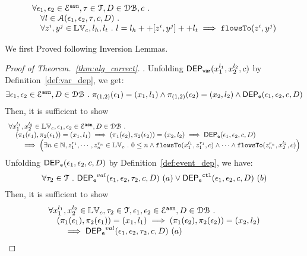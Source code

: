 
\begin{thm}[Correctness]
\label{thm:alg_correct}
\[
\begin{array}{l}
  \forall \mathtt{\epsilon}_1, \mathtt{\epsilon}_2 \in \mathcal{E}^{\mathtt{{asn}}}, \mathtt{\tau} \in \mathcal{T}, D \in \mathcal{DB} , c ~.~
  \\ \quad 
   \forall l \in \mathcal{A}(\mathtt{\epsilon}_1, \mathtt{\epsilon}_2, \mathtt{\tau}, c, D) ~.~
   \\ \quad 
   \forall z^i, y^j \in \mathbb{LV}_c, l_h, l_t ~.~ 
   l = l_h ++ [z^i, y^j] ++ l_t 
   \implies \mathtt{flowsTo}(z^i, y^j)
\end{array}
\]
\end{thm}

We first Proved following Inversion Lemmas.

\clearpage
\begin{proof}[Proof of Theorem.~\ref{thm:alg_correct}].
Unfolding $\mathsf{DEP_{var}}({x}_1^{l_1}, {x}_2^{l_2}, {c})$ by Definition~\ref{def:var_dep},
we get:
\[
\exists \mathtt{\epsilon}_1, \mathtt{\epsilon}_2 \in \mathcal{E}^{\mathtt{{asn}}}, D \in \mathcal{DB} ~.~
\pi_{(1,2)}{(\mathtt{\epsilon}_1)} = ({x}_1, l_1)
\land
\pi_{(1,2)}{(\mathtt{\epsilon}_2)} = ({x}_2, l_2)
\land 
\mathsf{DEP_{\mathtt{e}}}(\mathtt{\epsilon}_1, \mathtt{\epsilon}_2, c, D)
\]
%
Then, it is sufficient to show
%
\[
\begin{array}{l}
\forall {x}_1^{l_1}, {x}_2^{l_2} \in \mathbb{LV}_{{c}},
 \mathtt{\epsilon}_1, \mathtt{\epsilon}_2 \in \mathcal{E}^{\mathtt{{asn}}}, D \in \mathcal{DB} ~.~
 \\ \quad
(\pi_{1}{(\mathtt{\epsilon}_1)}, \pi_{2}{(\mathtt{\epsilon}_1)}) = ({x}_1, l_1)
\implies
(\pi_{1}{(\mathtt{\epsilon}_2)}, \pi_{2}{(\mathtt{\epsilon}_2)}) = ({x}_2, l_2)
\implies 
\mathsf{DEP_{\mathtt{e}}}(\mathtt{\epsilon}_1, \mathtt{\epsilon}_2, c, D)
 \\ \qquad \implies
   \Big(\exists  n \in \mathbb{N},z_1^{r_1}, \cdots, z_n^{r_n} \in \mathbb{LV}_{{c}} ~.~ 0 \leq n
 \land \mathtt{flowsTo}(x_1^{l_1}, z_1^{r_1}, c) \land \cdots \land \mathtt{flowsTo}(z_n^{r_n}, {x}_2^{l_2}, c) \Big)
\end{array}
\]
%
%
%
%
%
Unfolding $\mathsf{DEP_{\mathtt{e}}}(\mathtt{\epsilon}_1, \mathtt{\epsilon}_2, c, D)$ by Definition~\ref{def:event_dep}, we have:
\[
\forall \mathtt{\tau}_2 \in \mathcal{T} ~.~
\mathsf{DEP_{\mathtt{e}}}^{val}(\mathtt{\epsilon}_1, \mathtt{\epsilon}_2, \mathtt{\tau}_2, c, D) ~ (a) 
\lor
\mathsf{DEP_{\mathtt{e}}}^{\mathtt{{ctl}}}(\mathtt{\epsilon}_1, \mathtt{\epsilon}_2, c, D) ~ (b)
\]
%
Then, it is sufficient to show
%
\[
\begin{array}{l}
\forall {x}_1^{l_1}, {x}_2^{l_2} \in \mathbb{LV}_{{c}}, \mathtt{\tau}_2 \in \mathcal{T}, 
\mathtt{\epsilon}_1, \mathtt{\epsilon}_2 \in \mathcal{E}^{\mathtt{{asn}}}, D \in \mathcal{DB} ~.~
\\ \quad
(\pi_{1}{(\mathtt{\epsilon}_1)}, \pi_{2}{(\mathtt{\epsilon}_1)}) = ({x}_1, l_1)
\implies
(\pi_{1}{(\mathtt{\epsilon}_2)}, \pi_{2}{(\mathtt{\epsilon}_2)}) = ({x}_2, l_2)
 \\ \qquad \implies 
\mathsf{DEP_{\mathtt{e}}}^{val}(\mathtt{\epsilon}_1, \mathtt{\epsilon}_2, \mathtt{\tau}_2, c, D) ~ (a)

\end{array}\]
\end{proof}
